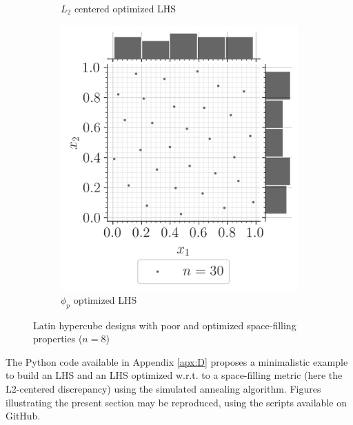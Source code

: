 \begin{figure}[ht]
\begin{subfigure}[b]{0.32\textwidth}
        \caption{$L_2$ centered optimized LHS}
    \end{subfigure}
    \hfill
    \begin{subfigure}[b]{0.32\textwidth}
        \centering
        \includegraphics[width=\textwidth]{../numerical_experiments/chapter1/figures/optimized_phip_LHS.png}
        \caption{$\phi_p$ optimized LHS}
    \end{subfigure}
       \caption{Latin hypercube designs with poor and optimized space-filling properties ($n=8$)}
       \label{fig:LHS_designs}
\end{figure}


\begin{otexample}
    The Python code available in Appendix \ref{apx:D} proposes a minimalistic \ot example to build an LHS and 
    an LHS optimized w.r.t. to a space-filling metric (here the L2-centered discrepancy) using the simulated annealing algorithm. 
    Figures illustrating the present section may be reproduced, using the \ot scripts available on GitHub\footnotemark.  
\end{otexample}

